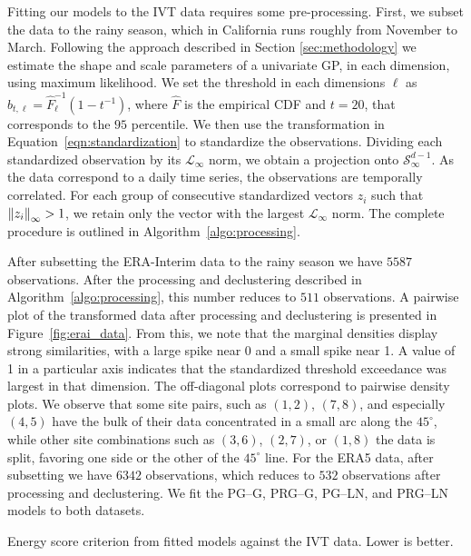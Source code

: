 Fitting our models to the IVT data requires some pre-processing. First, we subset the data to the rainy
  season, which in California runs roughly from November to March.  Following the approach described 
  in Section \ref{sec:methodology} we estimate the shape and scale parameters of a univariate GP, in each
  dimension, using maximum likelihood. We set the threshold in each dimensions $\ell$ as  
  $b_{t,\ell} = \hat{F}_{\ell}^{-1}(1 - t^{-1})$, where $\hat{F}$ is the empirical CDF and $t=20$, 
  that corresponds to the $95$ percentile. We then use the transformation in Equation~\eqref{eqn:standardization} 
  to standardize the observations.  Dividing each standardized observation
  by its $\mathcal{L}_{\infty}$ norm, we obtain a projection onto $\mathcal{S}_{\infty}^{d-1}$. As 
  the data correspond to a daily time series, the observations are temporally correlated.  For each
  group of consecutive standardized vectors $z_i$ such  that  $\inorm{z_i} > 1$, we retain only the
  vector with the largest $\mathcal{L}_{\infty}$ norm.  The complete procedure is outlined in
  Algorithm~\ref{algo:processing}.  
  
After subsetting the ERA-Interim data to the rainy season we 
  have $5587$ observations. After the processing and declustering described in
  Algorithm~\ref{algo:processing}, this number reduces to $511$ observations. A pairwise plot 
  of the transformed data after processing and declustering is presented in 
  Figure~\ref{fig:erai_data}.  From this, we note that the marginal densities display strong
  similarities, with a large spike near 0 and a small spike near 1. A value of 1 in a particular 
  axis indicates that the standardized threshold exceedance was largest in that dimension.  
  The off-diagonal plots correspond to pairwise density plots.  We observe that some site pairs, such 
  as $(1,2)$, $(7,8)$, and especially $(4,5)$ have the bulk of their data concentrated in a 
  small arc along the $45^{\circ}$, while other site combinations such as $(3,6)$, $(2,7)$, or
  $(1,8)$ the data is split, favoring one side or the other of the $45^{\circ}$ line. For the 
  ERA5 data, after subsetting we have $6342$ observations, which reduces to $532$ observations 
  after processing and declustering. We fit the PG--G, PRG--G, PG--LN, and PRG--LN models to 
  both datasets.

\begin{table}[htb]
  \centering
  \caption{Energy score criterion from fitted models against the IVT data. 
    Lower is better.\label{tab:dev}}
  
\end{table}

